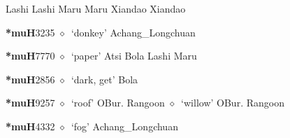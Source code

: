 \begin{list}{}{\leftmargin=1.5em \itemindent=-1.5em}
         Lashi 
\hspace{1ex}
         Lashi 
\hspace{1ex}
         Maru 
\hspace{1ex}
         Maru 
\hspace{1ex}
         Xiandao 
\hspace{1ex}
         Xiandao 
  \item {\footnotesize \textbf{*muH}}{\tiny 3235}
\hspace{1ex}
         $\diamond$~`donkey'
         Achang\_Longchuan 
  \item {\footnotesize \textbf{*muH}}{\tiny 7770}
\hspace{1ex}
         $\diamond$~`paper'
         Atsi 
\hspace{1ex}
         Bola 
\hspace{1ex}
         Lashi 
\hspace{1ex}
         Maru 
  \item {\footnotesize \textbf{*muH}}{\tiny 2856}
\hspace{1ex}
         $\diamond$~`dark, get'
         Bola 
  \item {\footnotesize \textbf{*muH}}{\tiny 9257}
\hspace{1ex}
         $\diamond$~`roof'
         OBur. 
\hspace{1ex}
         Rangoon 
\hspace{1ex}
         $\diamond$~`willow'
         OBur. 
\hspace{1ex}
         Rangoon 
  \item {\footnotesize \textbf{*muH}}{\tiny 4332}
\hspace{1ex}
         $\diamond$~`fog'
         Achang\_Longchuan 

\end{list}
